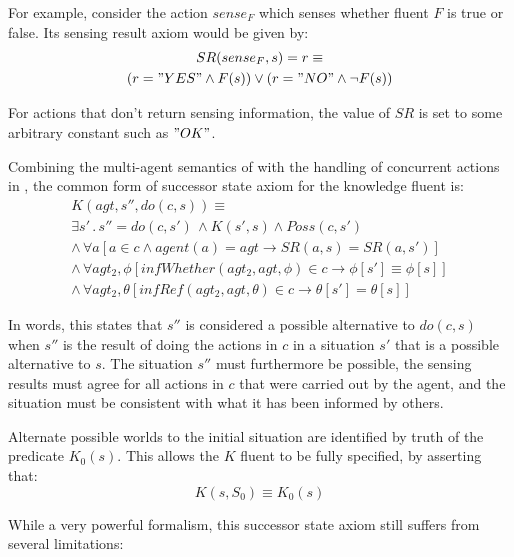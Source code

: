 \documentclass[letterpaper]{article}
\begin{document}
For example, consider the action $sense_{F}$ which senses whether
fluent $F$ is true or false. Its sensing result axiom would be given
by:
\begin{multline}
SR(sense_{F},s)=r\equiv\\
(r="YES"\wedge F(s))\vee(r="NO"\wedge\neg F(s))
\end{multline}


For actions that don't return sensing information, the value of $SR$
is set to some arbitrary constant such as $"OK"$.

Combining the multi-agent semantics of \cite{shapiro01casl_feat_inter}
with the handling of concurrent actions in \cite{scherl03conc_knowledge},
the common form of successor state axiom for the knowledge fluent
is:
\begin{multline}
K(agt,s'',do(c,s))\equiv\\
\exists s'\,.\,s''=do(c,s')\,\wedge K(s',s)\wedge Poss(c,s')\\
\wedge\,\forall a\left[a\in c\wedge agent(a)=agt\rightarrow
  SR(a,s)=SR(a,s')\right]\\
\wedge\,\forall agt_{2},\phi\left[infWhether(agt_{2},agt,\phi)\in c\rightarrow
  \phi[s']\equiv\phi[s]\right]\\
\wedge\,\forall agt_{2},\theta\left[infRef(agt_{2},agt,\theta)\in c\rightarrow
  \theta[s']=\theta[s]\right]
\end{multline}


In words, this states that $s''$ is considered a possible alternative
to $do(c,s)$ when $s''$ is the result of doing the actions in $c$
in a situation $s'$ that is a possible alternative to $s$. The situation
$s''$ must furthermore be possible, the sensing results must agree
for all actions in $c$ that were carried out by the agent, and the
situation must be consistent with what it has been informed by others.

Alternate possible worlds to the initial situation are identified
by truth of the predicate $K_{0}(s)$. This allows the $K$ fluent
to be fully specified, by asserting that:
\begin{equation}
K(s,S_{0})\equiv K_{0}(s)
\end{equation}


While a very powerful formalism, this successor state axiom still
suffers from several limitations:
\end{document}
